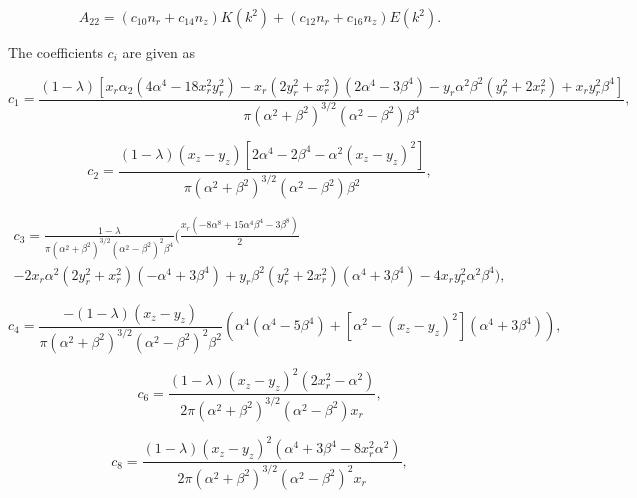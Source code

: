 \documentclass[12pt]{article}
\begin{document}
\begin{equation}
\label{equ:A22_comp}
A_{22} = (c_{10} n_{r} + c_{14} n_{z})K(k^{2}) + (c_{12} n_{r} + c_{16} n_{z})E(k^{2}).
\end{equation}

The coefficients $c_{i}$ are given as

\begin{equation}
\label{equ:coeff_a1}
c_{1} = \frac{(1 - \lambda) [x_{r} \alpha_{2} (4 \alpha^{4} - 18 x_{r}^{2} y_{r}^{2}) - x_{r} (2 y_{r}^{2} + x_{r}^{2}) (2 \alpha^{4} - 3 \beta^{4}) - y_{r} \alpha^{2} \beta^{2} (y_{r}^{2} + 2 x_{r}^{2}) + x_{r} y_{r}^{2} \beta^{4}]}{\pi (\alpha^{2} + \beta^{2})^{3/2} (\alpha^{2} - \beta^{2}) \beta^{4}},
\end{equation}

\begin{equation}
\label{equ:equ:coeff_a2}
c_{2} = \frac{(1 - \lambda) (x_{z} - y_{z}) [2 \alpha^{4} - 2 \beta^{4} - \alpha^{2} (x_{z} - y_{z})^{2}]}{\pi (\alpha^{2} + \beta^{2})^{3/2} (\alpha^{2} - \beta^{2}) \beta^{2}},
\end{equation}

\begin{align}
\label{equ:coeff_a3}
c_{3} = \frac{1 - \lambda}{\pi (\alpha^{2} + \beta^{2})^{3/2} (\alpha^{2} - \beta^{2})^{2} \beta^{4}} \bigg( \frac{x_{r} (-8 \alpha^{8} + 15 \alpha^{4} \beta^{4} - 3 \beta^{8})}{2} \nonumber \\
- 2 x_{r} \alpha^{2} (2 y_{r}^{2} + x_{r}^{2}) (-\alpha^{4} + 3 \beta^{4}) + y_{r} \beta^{2} (y_{r}^{2} + 2 x_{r}^{2}) (\alpha^{4} + 3 \beta^{4}) - 4 x_{r} y_{r}^{2} \alpha^{2} \beta^{4} \bigg),
\end{align}

\begin{equation}
\label{equ:coeff_a4}
c_{4} = \frac{-(1 - \lambda) (x_{z} - y_{z})}{\pi (\alpha^{2} + \beta^{2})^{3/2} (\alpha^{2} - \beta^{2})^{2} \beta^{2}} \left(\alpha^{4} (\alpha^{4} - 5 \beta^{4}) + [\alpha^{2}- (x_{z} - y_{z})^{2}] (\alpha^{4} + 3 \beta^{4}) \right),
\end{equation}

\begin{equation}
\label{equ:coeff_a6}
c_{6} = \frac{(1 - \lambda) (x_{z} - y_{z})^{2} (2 x_{r}^{2} - \alpha^{2})}{2 \pi (\alpha^{2} + \beta^{2})^{3/2} (\alpha^{2} - \beta^{2}) x_{r}},
\end{equation}

\begin{equation}
\label{equ:coeff_a8}
c_{8} = \frac{(1 - \lambda) (x_{z} - y_{z})^{2} (\alpha^{4} + 3 \beta^{4} - 8 x_{r}^{2} \alpha^{2})}{2 \pi (\alpha^{2} + \beta^{2})^{3/2} (\alpha^{2} - \beta^{2})^{2} x_{r}},
\end{equation}
\end{document}
